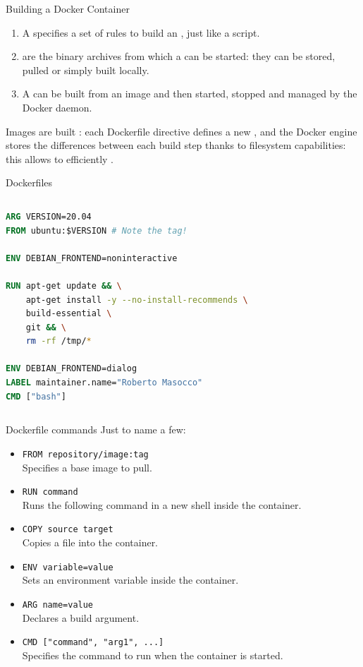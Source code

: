 \begin{frame}{Building a Docker Container}
\begin{enumerate}
  \item A  specifies a set of rules to build an , just like a script.
  \item {} are the binary archives from which a  can be started: they can be stored, pulled or simply built locally.
  \item A  can be built from an image and then started, stopped and managed by the Docker daemon.
\end{enumerate}
Images are built : each Dockerfile directive defines a new , and the Docker engine stores the differences between each build step thanks to filesystem capabilities: this allows to efficiently .
\end{frame}

\begin{frame}[fragile]{Dockerfiles}
\begin{columns}
\begin{lstlisting}[language=Dockerfile, caption=Minimal example of a Dockerfile running an Ubuntu image in a container]
ARG VERSION=20.04
FROM ubuntu:$VERSION # Note the tag!

ENV DEBIAN_FRONTEND=noninteractive

RUN apt-get update && \
    apt-get install -y --no-install-recommends \
    build-essential \
    git && \
    rm -rf /tmp/*

ENV DEBIAN_FRONTEND=dialog
LABEL maintainer.name="Roberto Masocco"
CMD ["bash"]
\end{lstlisting}
\end{columns}
\end{frame}
\begin{frame}{Dockerfile commands}
Just to name a few:
\begin{itemize}
  \item \texttt{FROM repository/image:tag}\\Specifies a base image to pull.
  \item \texttt{RUN command}\\Runs the following command in a new shell inside the container.
  \item \texttt{COPY source target}\\Copies a file into the container.
  \item \texttt{ENV variable=value}\\Sets an environment variable inside the container.
  \item \texttt{ARG name=value}\\Declares a build argument.
  \item \texttt{CMD ["command", "arg1", ...]}\\Specifies the command to run when the container is started.
\end{itemize}
\end{frame}
